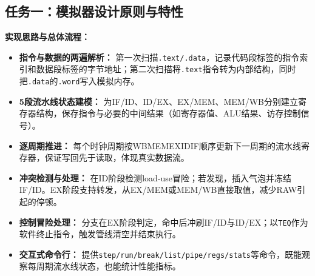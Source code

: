 \documentclass[12pt,a4paper]{ctexart}
\begin{document}
\subsection{任务一：模拟器设计原则与特性}
\textbf{实现思路与总体流程：}
\begin{itemize}
	\item \textbf{指令与数据的两遍解析：} 第一次扫描\texttt{.text/.data}，记录代码段标签的指令索引和数据段标签的字节地址；第二次扫描将\texttt{.text}指令转为内部结构，同时把\texttt{.data}的\texttt{.word}写入模拟内存。
	\item \textbf{5段流水线状态建模：} 为IF/ID、ID/EX、EX/MEM、MEM/WB分别建立寄存器结构，保存指令与必要的中间结果（如寄存器值、ALU结果、访存控制信号）。
	\item \textbf{逐周期推进：} 每个时钟周期按WB\textrightarrow MEM\textrightarrow EX\textrightarrow ID\textrightarrow IF顺序更新下一周期的流水线寄存器，保证写回先于读取，体现真实数据流。
	\item \textbf{冲突检测与处理：} 在ID阶段检测load-use冒险；若发现，插入气泡并冻结IF/ID。EX阶段支持转发，从EX/MEM或MEM/WB直接取值，减少RAW引起的停顿。
	\item \textbf{控制冒险处理：} 分支在EX阶段判定，命中后冲刷IF/ID与ID/EX；以\texttt{TEQ}作为软件终止指令，触发管线清空并结束执行。
	\item \textbf{交互式命令行：} 提供\texttt{step/run/break/list/pipe/regs/stats}等命令，既能观察每周期流水线状态，也能统计性能指标。
\end{itemize}
\end{document}
